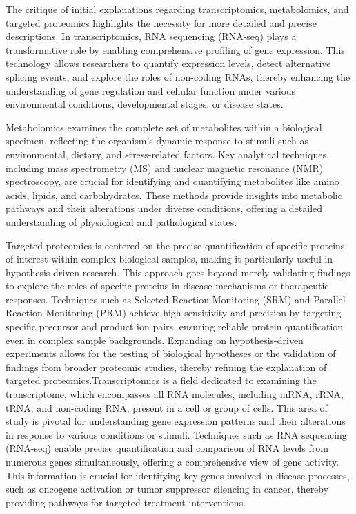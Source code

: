 The critique of initial explanations regarding transcriptomics, metabolomics, and targeted proteomics highlights the necessity for more detailed and precise descriptions. In transcriptomics, RNA sequencing (RNA-seq) plays a transformative role by enabling comprehensive profiling of gene expression. This technology allows researchers to quantify expression levels, detect alternative splicing events, and explore the roles of non-coding RNAs, thereby enhancing the understanding of gene regulation and cellular function under various environmental conditions, developmental stages, or disease states.

Metabolomics examines the complete set of metabolites within a biological specimen, reflecting the organism's dynamic response to stimuli such as environmental, dietary, and stress-related factors. Key analytical techniques, including mass spectrometry (MS) and nuclear magnetic resonance (NMR) spectroscopy, are crucial for identifying and quantifying metabolites like amino acids, lipids, and carbohydrates. These methods provide insights into metabolic pathways and their alterations under diverse conditions, offering a detailed understanding of physiological and pathological states.

Targeted proteomics is centered on the precise quantification of specific proteins of interest within complex biological samples, making it particularly useful in hypothesis-driven research. This approach goes beyond merely validating findings to explore the roles of specific proteins in disease mechanisms or therapeutic responses. Techniques such as Selected Reaction Monitoring (SRM) and Parallel Reaction Monitoring (PRM) achieve high sensitivity and precision by targeting specific precursor and product ion pairs, ensuring reliable protein quantification even in complex sample backgrounds. Expanding on hypothesis-driven experiments allows for the testing of biological hypotheses or the validation of findings from broader proteomic studies, thereby refining the explanation of targeted proteomics.Transcriptomics is a field dedicated to examining the transcriptome, which encompasses all RNA molecules, including mRNA, rRNA, tRNA, and non-coding RNA, present in a cell or group of cells. This area of study is pivotal for understanding gene expression patterns and their alterations in response to various conditions or stimuli. Techniques such as RNA sequencing (RNA-seq) enable precise quantification and comparison of RNA levels from numerous genes simultaneously, offering a comprehensive view of gene activity. This information is crucial for identifying key genes involved in disease processes, such as oncogene activation or tumor suppressor silencing in cancer, thereby providing pathways for targeted treatment interventions.

